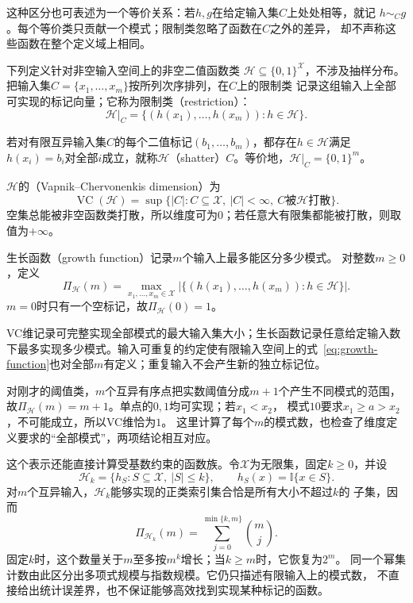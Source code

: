 这种区分也可表述为一个等价关系：若$h,g$在给定输入集$C$上处处相等，就记
$h\sim_C g$。每个等价类只贡献一个模式；限制类忽略了函数在$C$之外的差异，
却不声称这些函数在整个定义域上相同。

下列定义针对非空输入空间上的非空二值函数类
\(\mathcal H\subseteq\{0,1\}^{\mathcal X}\)，不涉及抽样分布。
把输入集\(C=\{x_1,\ldots,x_m\}\)按所列次序排列，在\(C\)上的限制类
记录这组输入上全部可实现的标记向量；它称为限制类（restriction）：
\[
  \mathcal H|_C=\{(h(x_1),\ldots,h(x_m)):h\in\mathcal H\}.
\]
\begin{definition}[打散]
  \label{def:shattering}
  若对有限互异输入集\(C\)的每个二值标记\((b_1,\ldots,b_m)\)，都存在\(h\in\mathcal H\)满足\(h(x_i)=b_i\)对全部\(i\)成立，就称\(\mathcal H\)（shatter）\(C\)。等价地，\(\mathcal H|_C=\{0,1\}^m\)。
\end{definition}
\begin{definition}[VC维]
  \label{def:vc-dimension}
  \(\mathcal H\)的（Vapnik--Chervonenkis dimension）为
  \[
    \operatorname{VC}(\mathcal H)
    =\sup\{|C|:C\subseteq\mathcal X,\ |C|<\infty,\ C\text{被}\mathcal H\text{打散}\}.
  \]
  空集总能被非空函数类打散，所以维度可为\(0\)；若任意大有限集都能被打散，则取值为\(+\infty\)。
\end{definition}
\begin{definition}[生长函数]
  \label{def:growth-function}
  生长函数（growth function）记录$m$个输入上最多能区分多少模式。
  对整数\(m\geq0\)，定义
  \begin{equation}
    \Pi_{\mathcal H}(m)
    =\max_{x_1,\ldots,x_m\in\mathcal X}
    |\{(h(x_1),\ldots,h(x_m)):h\in\mathcal H\}|.
    \label{eq:growth-function}
  \end{equation}
  \(m=0\)时只有一个空标记，故\(\Pi_{\mathcal H}(0)=1\)。
\end{definition}
VC维记录可完整实现全部模式的最大输入集大小；生长函数记录任意给定输入数下最多实现多少模式。输入可重复的约定使有限输入空间上的式~\eqref{eq:growth-function}也对全部\(m\)有定义；重复输入不会产生新的独立标记位。

对刚才的阈值类，$m$个互异有序点把实数阈值分成$m+1$个产生不同模式的范围，
故$\Pi_{\mathcal H}(m)=m+1$。单点的$0,1$均可实现；若$x_1<x_2$，
模式$10$要求$x_1\geq a>x_2$，不可能成立，所以VC维恰为$1$。
这里计算了每个$m$的模式数，也检查了维度定义要求的“全部模式”，两项结论相互对应。

这个表示还能直接计算受基数约束的函数族。令$\mathcal{X}$为无限集，固定$k\geq0$，并设
\[
  \mathcal{H}_k
  =
  \{h_S:S\subseteq\mathcal{X},\ |S|\leq k\},
  \qquad
  h_S(x)=\mathbb{I}\{x\in S\}.
\]
对$m$个互异输入，$\mathcal{H}_k$能够实现的正类索引集合恰是所有大小不超过$k$的
子集，因而
\[
  \Pi_{\mathcal{H}_k}(m)
  =
  \sum_{j=0}^{\min\{k,m\}}\binom{m}{j}.
\]
固定$k$时，这个数量关于$m$至多按$m^k$增长；当$k\geq m$时，它恢复为$2^m$。
同一个幂集计数由此区分出多项式规模与指数规模。它仍只描述有限输入上的模式数，
不直接给出统计误差界，也不保证能够高效找到实现某种标记的函数。


